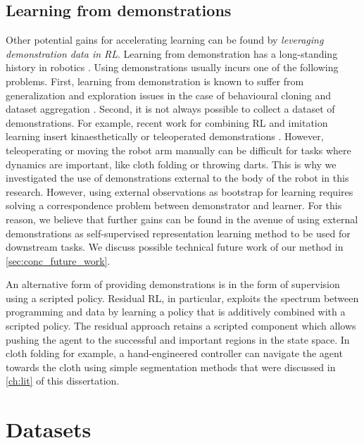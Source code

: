 \documentclass[\home/main.tex]{subfiles}
\begin{document}
\subsection{Learning from demonstrations}
Other potential gains for accelerating learning can be found by \emph{leveraging demonstration data in RL}.
Learning from demonstration has a long-standing history in robotics \autocite{Argall2009}. Using demonstrations usually incurs one of the following problems.
First, learning from demonstration is known to suffer from generalization and exploration issues in the case of behavioural cloning and dataset aggregation \autocite{Ibarz2021}.
Second, it is not always possible to collect a dataset of demonstrations. For example, recent work for combining RL and imitation learning insert kinaesthetically \autocite{vecerik2018leveraging} or teleoperated demonstrations \autocite{Zhu-RSS-18}. However, teleoperating or moving the robot arm manually can be difficult for tasks where dynamics are important, like cloth folding or throwing darts. This is why we investigated the use of demonstrations external to the body of the robot in this research. However, using external observations as bootstrap for learning requires solving a correspondence problem between demonstrator and learner. For this reason, we believe that further gains can be found in the avenue of using external demonstrations as self-supervised representation learning method to be used for downstream tasks. We discuss possible technical future work of our method in \cref{sec:conc_future_work}.

An alternative form of providing demonstrations is in the form of supervision using a scripted policy. Residual RL, in particular, exploits the spectrum between programming and data by learning a policy that is additively combined with a scripted policy. The residual approach retains a scripted component which allows pushing the agent to the successful and important regions in the state space. In cloth folding for example, a hand-engineered controller can navigate the agent towards the cloth using simple segmentation methods that were discussed in \cref{ch:lit} of this dissertation.

\section{Datasets}
\end{document}
